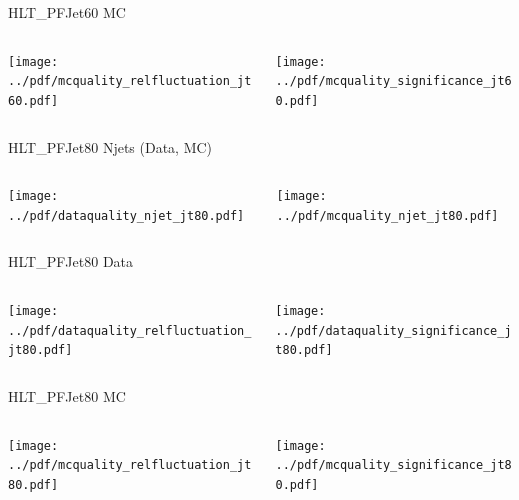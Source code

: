 \documentclass[9pt]{beamer}
\begin{document}
\begin{frame}[t]{HLT\_PFJet60 MC}
\begin{columns}[T]
  \begin{column}{.5\textwidth}
  \texttt{[image: ../pdf/mcquality\_relfluctuation\_jt60.pdf]}
  \end{column}
  \begin{column}{.5\textwidth}
  \texttt{[image: ../pdf/mcquality\_significance\_jt60.pdf]}
  \end{column}
\end{columns}
\end{frame}

\begin{frame}[t]{HLT\_PFJet80 Njets (Data, MC)}
\begin{columns}[T]
  \begin{column}{.5\textwidth}
  \texttt{[image: ../pdf/dataquality\_njet\_jt80.pdf]}
  \end{column}
  \begin{column}{.5\textwidth}
  \texttt{[image: ../pdf/mcquality\_njet\_jt80.pdf]}
  \end{column}
\end{columns}
\end{frame}

\begin{frame}[t]{HLT\_PFJet80 Data}
\begin{columns}[T]
  \begin{column}{.5\textwidth}
  \texttt{[image: ../pdf/dataquality\_relfluctuation\_jt80.pdf]}
  \end{column}
  \begin{column}{.5\textwidth}
  \texttt{[image: ../pdf/dataquality\_significance\_jt80.pdf]}
  \end{column}
\end{columns}
\end{frame}

\begin{frame}[t]{HLT\_PFJet80 MC}
\begin{columns}[T]
  \begin{column}{.5\textwidth}
  \texttt{[image: ../pdf/mcquality\_relfluctuation\_jt80.pdf]}
  \end{column}
  \begin{column}{.5\textwidth}
  \texttt{[image: ../pdf/mcquality\_significance\_jt80.pdf]}
  \end{column}
\end{columns}
\end{frame}
\end{document}
